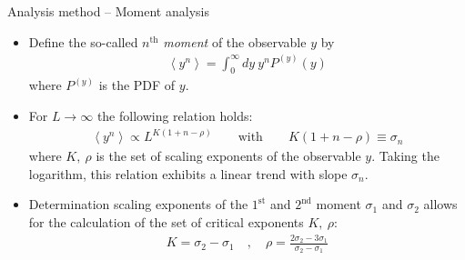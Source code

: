 \documentclass[xcolor=dvipsnames]{beamer}
\newcommand{\myitemsep}{\setlength\itemsep{0.33cm}}
\begin{document}
	\begin{frame}{Analysis method -- Moment analysis}
		\begin{itemize}
			\myitemsep
			\item {Define the so-called $n^{\mathrm{th}}$ \textit{moment} of the observable $y$ by
				\begin{align*}
				\left\langle y^n \right\rangle = \int_{0}^{\infty} dy\ y^n P^{(y)}(y)
				\end{align*}
				where $P^{(y)}$ is the PDF of $y$.
			}
			\item {For $L \to \infty$ the following relation holds:
				\begin{align*}
				\left\langle y^n \right\rangle \propto L^{K\left(1 + n - \rho \right)} \qquad \text{with} \qquad K\left(1 + n - \rho \right) \equiv \sigma_n 
				\end{align*}
				where  $K,\ \rho$ is the set of scaling exponents of the observable $y$. Taking the logarithm, this relation exhibits a linear trend with slope $\sigma_n$.
			}
			\item {Determination scaling exponents of the $1^{\text{st}}$ and $2^{\text{nd}}$ moment $\sigma_1$ and $\sigma_2$ allows for the calculation of the set of critical exponents $K,\ \rho$:
				\begin{align*}
				K = \sigma_2 - \sigma_1 \quad , \quad \rho = \frac{2\sigma_2 - 3\sigma_1}{\sigma_2 - \sigma_1} 
				\end{align*} 
			}
		\end{itemize}
	\end{frame}
	
\end{document}

